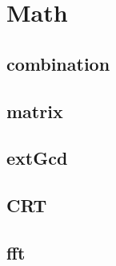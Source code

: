 \section{Math}

\subsection{combination}


\subsection{matrix}


\subsection{extGcd}


\subsection{CRT}


\subsection{fft}

